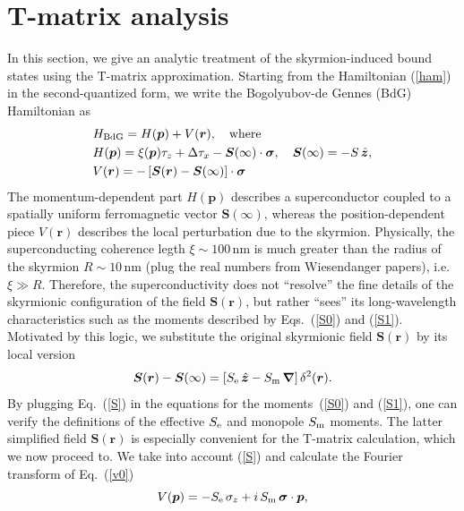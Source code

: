 \documentclass[twocolumn,showpacs,floatfix,nofootinbib,longbibliography]{revtex4-1}
\begin{document}
\section{T-matrix analysis} \label{sec:appendixTMatrix}
In this section, we give an analytic treatment of the skyrmion-induced bound states using the T-matrix approximation. Starting from the Hamiltonian (\ref{ham}) in the second-quantized form, we write the Bogolyubov-de Gennes (BdG) Hamiltonian as
\begin{align}
	& H_{\rm BdG} = H(\bm p) + V(\bm r),\quad {\rm where} \nonumber \\
& H(\bm p) = \xi(\bm p)\tau_z+\Delta \tau_x - \bm S(\infty)\cdot\bm\sigma,\quad \bm S(\infty) = -S\,\hat{\bm z}, \nonumber\\
& V(\bm r) = -\left[ \bm S(\bm r)-\bm S(\infty)\right]\cdot\bm\sigma \label{v0}
\end{align}
The momentum-dependent part $H(\bm p)$ describes a superconductor coupled to a spatially uniform ferromagnetic vector $\bm S(\infty)$, whereas the position-dependent piece $V(\bm r)$ describes the local perturbation due to the skyrmion. Physically, the superconducting coherence legth $\xi\sim 100$\,nm is much greater than the radius of the skyrmion $R\sim 10$\,nm (plug the real numbers from Wiesendanger papers), i.e. $\xi\gg R$. Therefore, the superconductivity does not ``resolve'' the fine details of the skyrmionic configuration of the field  $\bm S(\bm r)$, but rather ``sees'' its long-wavelength characteristics such as the moments described by Eqs.~(\ref{S0}) and (\ref{S1}). Motivated by this logic, we substitute the original skyrmionic field $\bm S(\bm r)$ by its local version
\begin{equation}
	\bm S(\bm r) - \bm S(\infty) = \left[ S_{\rm e}\, \hat{\bm z} - S_{\rm m}\, \bm \nabla\right] \delta^2(\bm r).
	\label{S}
\end{equation}
By plugging Eq.~(\ref{S}) in the equations for the moments~(\ref{S0}) and (\ref{S1}), one can verify the definitions of the effective $S_{\rm e}$ and monopole $S_{\rm m}$ moments.  The latter simplified field $\bm S(\bm r)$ is especially convenient for the T-matrix calculation, which we now proceed to. We take into account (\ref{S}) and calculate the Fourier transform of Eq.~(\ref{v0})
\begin{equation}
	V(\bm p) = -S_{\rm e}\,\sigma_z +  i \,S_{\rm m} \, \bm \sigma\cdot \bm  p,
	\label{vp}
\end{equation}
\end{document}
